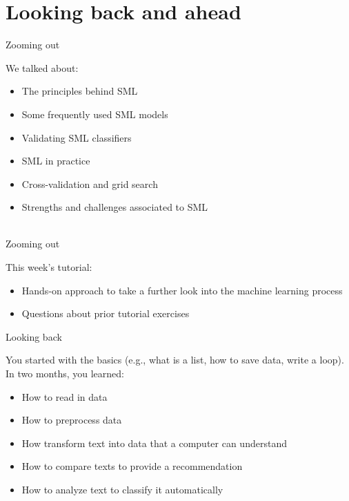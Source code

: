 \documentclass[handout]{beamer}
\begin{document}
\section{Looking back and ahead}

\begin{frame}{Zooming out} 
	
	We talked about:
	\begin{itemize}
		\item The principles behind SML
		\item Some frequently used SML models
		\item Validating SML classifiers
		\item SML in practice
		\item Cross-validation and grid search
		\item Strengths and challenges associated to SML \\\
\end{itemize}
	

\end{frame}


\begin{frame}{Zooming out} 
	
This week's tutorial:
	\begin{itemize}
		\item Hands-on approach to take a further look into the machine learning process
		\item Questions about prior tutorial exercises
	\end{itemize}
	
\end{frame}


\begin{frame}{Looking back} 
	
You started with the basics (e.g., what is a list, how to save data, write a loop).\\
In two months, you learned:
	\begin{itemize}
		\item How to read in data
		\item How to preprocess data
		\item How transform text into data that a computer can understand
		\item How to compare texts to provide a recommendation
		\item How to analyze text to classify it automatically
	
	\end{itemize}
	
\end{frame}
\end{document}
